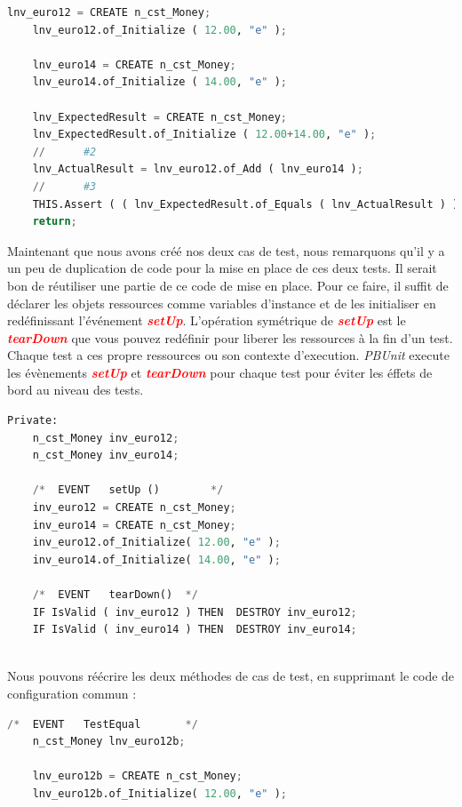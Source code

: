 \documentclass[a4paper,11pt,french]{report}
\theoremstyle{definition}
\begin{document}
\begin{itemize}
\begin{lstlisting}[language=Python, caption=Test d'addition de deux \textit{money}]
    lnv_euro12 = CREATE n_cst_Money;
    lnv_euro12.of_Initialize ( 12.00, "e" );
    
    lnv_euro14 = CREATE n_cst_Money;
    lnv_euro14.of_Initialize ( 14.00, "e" );
    
    lnv_ExpectedResult = CREATE n_cst_Money;
    lnv_ExpectedResult.of_Initialize ( 12.00+14.00, "e" );
    //		#2
    lnv_ActualResult = lnv_euro12.of_Add ( lnv_euro14 );
    //		#3
    THIS.Assert ( ( lnv_ExpectedResult.of_Equals ( lnv_ActualResult ) ), true );
    return;
\end{lstlisting}
Maintenant que nous avons créé nos deux cas de test, nous remarquons qu'il y a un peu de duplication de code pour la mise en place de ces deux tests. 
 Il serait bon de réutiliser une partie de ce code de mise en place. 
 Pour ce faire, il suffit de déclarer les objets ressources comme variables d'instance et de les initialiser en redéfinissant l'événement \textit{\textbf{\textcolor{red}{setUp}}}.
 L'opération symétrique de \textit{\textbf{\textcolor{red}{setUp}}}  est le \textit{\textbf{\textcolor{red}{tearDown}}} que vous pouvez redéfinir pour liberer les ressources  à la fin d'un test. 
 Chaque test a ces propre ressources ou son contexte d'execution. \textit{PBUnit}  execute les évènements \textit{\textbf{\textcolor{red}{setUp}}} et \textit{\textbf{\textcolor{red}{tearDown}}}
 pour chaque test pour éviter les éffets de bord au niveau des tests.
 
 \begin{lstlisting}[language=Python, caption=Setup et TearDown]
    Private:
    n_cst_Money	inv_euro12;
    n_cst_Money	inv_euro14;
    
    /*	EVENT	setUp ()		*/
    inv_euro12 = CREATE n_cst_Money;
    inv_euro14 = CREATE n_cst_Money;
    inv_euro12.of_Initialize( 12.00, "e" );
    inv_euro14.of_Initialize( 14.00, "e" );
    
    /*	EVENT	tearDown()	*/
    IF IsValid ( inv_euro12 ) THEN 	DESTROY inv_euro12; 
    IF IsValid ( inv_euro14 ) THEN 	DESTROY inv_euro14;
    
\end{lstlisting}
Nous pouvons réécrire les deux méthodes de cas de test, en supprimant le code de configuration commun :

\begin{lstlisting}[language=Python, caption=Test d'egalité sans la logique du d'initialisation]
    /*	EVENT	TestEqual		*/
    n_cst_Money	lnv_euro12b;
    
    lnv_euro12b = CREATE n_cst_Money;
    lnv_euro12b.of_Initialize( 12.00, "e" );
    

\end{lstlisting}
\end{itemize}
\end{document}
